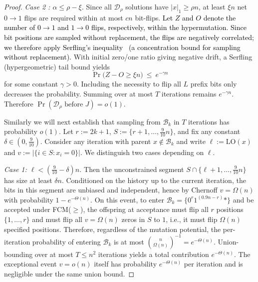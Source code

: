 \documentclass[lettersize,journal]{IEEEtran}
\newcommand{\rerev}[1]{\textcolor{black}{#1}}
\begin{document}
{\begin{proof}
	\emph{Case 2 : $\alpha\le \rho-\xi$.}
	Since all $\mathcal{D}_\rho$ solutions have $|x|_1\ge \rho n$, at least $\xi n$ net $0\!\to\!1$ flips are required within at most
	$cn$ bit-flips. \rerev{Let $Z$ and $O$ denote the number of $0\!\to\!1$ and $1\!\to\!0$ flips, respectively, within the hypermutation. Since bit positions are sampled without replacement, the flips are negatively correlated; we therefore apply Serfling's inequality~\cite{serfling1974probability} (a concentration bound for sampling without replacement).} With initial zero/one ratio giving negative drift,
	a Serfling (hypergeometric) tail bound yields
	\[
	\Pr\bigl(Z-O\ge \xi n\bigr)\ \le\ e^{-\gamma n}
	\]
	for some constant $\gamma>0$. Including the necessity to flip all $L$ prefix bits only decreases the probability.
	Summing over at most $T$ iterations remains $e^{-\gamma n}$. Therefore $\Pr(\text{$\mathcal{D}_\rho$ before }J)=o(1)$.
	
	Similarly we will next establish that sampling from $\mathcal{B}_k$ in $T$ iterations  has probability $o(1)$.	Let $r:=2k{+}1$, $S:=\{r{+}1,\dots,\tfrac{9}{10}n\}$, and fix any constant
	$\delta\in(0,\tfrac{9}{10})$.  Consider any iteration with parent
	$x\notin\mathcal{B}_k$ and write $\ell:=\mathrm{LO}(x)$ and
	$v:=|\{i\in S:x_i=0\}|$.  We distinguish two cases depending on $\ell$.
	
	\emph{Case 1: $\ell < (\tfrac{9}{10}-\delta)n$.}
	Then the unconstrained segment
	$S\cap\{\ell{+}1,\dots,\tfrac{9}{10}n\}$ has size at least $\delta n$.
	Conditioned on the history up to the current iteration, the bits in this segment
	are unbiased and independent, hence by Chernoff $v=\Omega(n)$ with probability
	$1-e^{-\Theta(n)}$.  On this event, to enter
	$\mathcal{B}_k=\{0^{r}1^{(0.9n-r)}*\}$ and be accepted under FCM($\ge$), the
	offspring at acceptance must flip all $r$ positions $\{1,\dots,r\}$ and must flip
	all $v=\Omega(n)$ zeros in $S$ to $1$, i.e., it must flip $\Omega(n)$ specified
	positions.  Therefore, regardless of the mutation potential, the per-iteration
	probability of entering $\mathcal{B}_k$ is at most
	$\binom{n}{\Omega(n)}^{-1}=e^{-\Theta(n)}$.  Union-bounding over at most
	$T\le n^2$ iterations yields a total contribution $e^{-\Theta(n)}$.
	The exceptional event $v=o(n)$ itself has probability $e^{-\Theta(n)}$ per
	iteration and is negligible under the same union bound.
	

\end{proof}}
\end{document}
